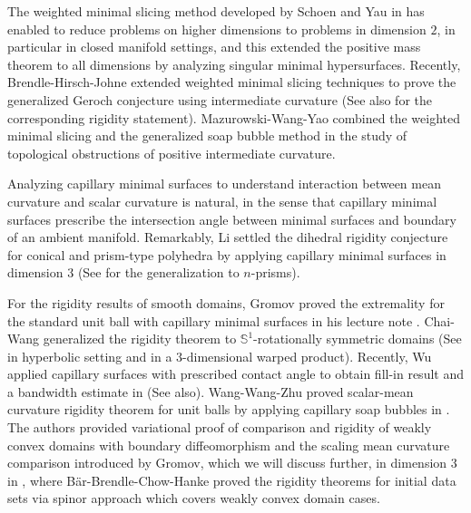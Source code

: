 \documentclass[11pt,letterpaper]{amsart}
\begin{document}
The weighted minimal slicing method developed by Schoen and Yau in \cite{schoen2017positive} has enabled to reduce problems on higher dimensions to problems in dimension $2$, in particular in closed manifold settings, and this extended the positive mass theorem to all dimensions by analyzing singular minimal hypersurfaces. Recently, Brendle-Hirsch-Johne extended weighted minimal slicing techniques to prove the generalized Geroch conjecture using intermediate curvature \cite{brendle2024generalization} (See also \cite{chu2022rigidity} for the corresponding rigidity statement). Mazurowski-Wang-Yao \cite{mazurowski2026topology} combined the weighted minimal slicing and the generalized soap bubble method in the study of topological obstructions of positive intermediate curvature.

Analyzing capillary minimal surfaces to understand interaction between mean curvature and scalar curvature is natural, in the sense that capillary minimal surfaces prescribe the intersection angle between minimal surfaces and boundary of an ambient manifold. Remarkably, Li settled the dihedral rigidity conjecture for conical and prism-type polyhedra by applying capillary minimal surfaces in dimension $3$ \cite{li2020polyhedron} (See \cite{li2024dihedral} for the generalization to $n$-prisms).

For the rigidity results of smooth domains, Gromov proved the extremality for the standard unit ball with capillary minimal surfaces in his lecture note \cite{gromov2021lecturesscalarcurvature}. Chai-Wang \cite{CW1} generalized the rigidity theorem to $\mathbb{S}^{1}$-rotationally symmetric domains (See \cite{chai2024dihedral} in hyperbolic setting and \cite{chai2025scalar} in a $3$-dimensional warped product). Recently, Wu applied capillary surfaces with prescribed contact angle to obtain fill-in result and a bandwidth estimate in \cite{wu2025capillary} (See \cite{wu2025rigidity} also). Wang-Wang-Zhu proved scalar-mean curvature rigidity theorem for unit balls by applying capillary soap bubbles in \cite{wang2024scalar}.  The authors provided variational proof of comparison and rigidity of weakly convex domains with boundary diffeomorphism and the scaling mean curvature comparison introduced by Gromov, which we will discuss further, in dimension $3$ in \cite{koyao}, where Bär-Brendle-Chow-Hanke \cite{bar2023rigidity} proved the rigidity theorems for initial data sets via spinor approach which covers weakly convex domain cases.
\end{document}
